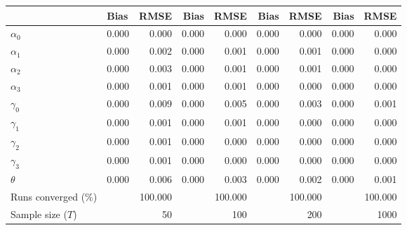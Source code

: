 
\begin{tabular}[t]{llrrrrrrr}
\toprule
  & Bias & RMSE & Bias & RMSE & Bias & RMSE & Bias & RMSE\\
\midrule
$\alpha_{0}$ & 0.000 & 0.000 & 0.000 & 0.000 & 0.000 & 0.000 & 0.000 & 0.000\\
$\alpha_{1}$ & 0.000 & 0.002 & 0.000 & 0.001 & 0.000 & 0.001 & 0.000 & 0.000\\
$\alpha_{2}$ & 0.000 & 0.003 & 0.000 & 0.001 & 0.000 & 0.001 & 0.000 & 0.000\\
$\alpha_{3}$ & 0.000 & 0.001 & 0.000 & 0.001 & 0.000 & 0.000 & 0.000 & 0.000\\
$\gamma_{0}$ & 0.000 & 0.009 & 0.000 & 0.005 & 0.000 & 0.003 & 0.000 & 0.001\\
$\gamma_{1}$ & 0.000 & 0.001 & 0.000 & 0.001 & 0.000 & 0.000 & 0.000 & 0.000\\
$\gamma_{2}$ & 0.000 & 0.001 & 0.000 & 0.000 & 0.000 & 0.000 & 0.000 & 0.000\\
$\gamma_{3}$ & 0.000 & 0.001 & 0.000 & 0.000 & 0.000 & 0.000 & 0.000 & 0.000\\
$\theta$ & 0.000 & 0.006 & 0.000 & 0.003 & 0.000 & 0.002 & 0.000 & 0.001\\
Runs converged (\%) &  & 100.000 &  & 100.000 &  & 100.000 &  & 100.000\\
Sample size ($T$) &  & 50 &  & 100 &  & 200 &  & 1000\\
\bottomrule
\end{tabular}
